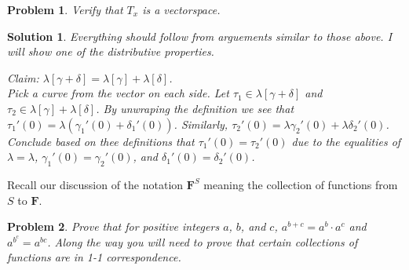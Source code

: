\documentclass{article}
\theoremstyle{problemstyle}
\newtheorem{problem}{Problem}
\theoremstyle{problemstyle}
\newtheorem{solution}{Solution}
\theoremstyle{problemstyle}
\begin{document}
\begin{problem}
Verify that $T_x$ is a vectorspace. 
\end{problem}

\begin{solution}
Everything should follow from arguements similar to those above. I will show one of the distributive properties. 

Claim: $\lambda[\gamma+\delta] = \lambda[\gamma]+\lambda[\delta]$.\\

Pick a curve from the vector on each side. Let $\tau_1 \in \lambda[\gamma+\delta]$ and $\tau_2 \in \lambda[\gamma]+\lambda[\delta]$. By unwraping the definition we see that $\tau_1'(0) = \lambda(\gamma_1'(0)+\delta_1'(0))$. Similarly, $\tau_2'(0) = \lambda\gamma_2'(0)+\lambda\delta_2'(0)$. Conclude based on thee definitions that $\tau_1'(0) = \tau_2'(0)$ due to the equalities of $\lambda = \lambda$, $\gamma_1'(0) = \gamma_2'(0)$, and $\delta_1'(0) = \delta_2'(0)$.
\end{solution}

Recall our discussion of the notation $\textbf{F}^S$ meaning the collection of functions from $S$ to $\textbf{F}$.

\begin{problem}
Prove that for positive integers $a$, $b$, and $c$, $a^{b+c} = a^b\cdot a^c$ and $a^{b^c} = a^{bc}$. Along the way you will need to prove that certain collections of functions are in 1-1 correspondence. 
\end{problem}
\end{document}
